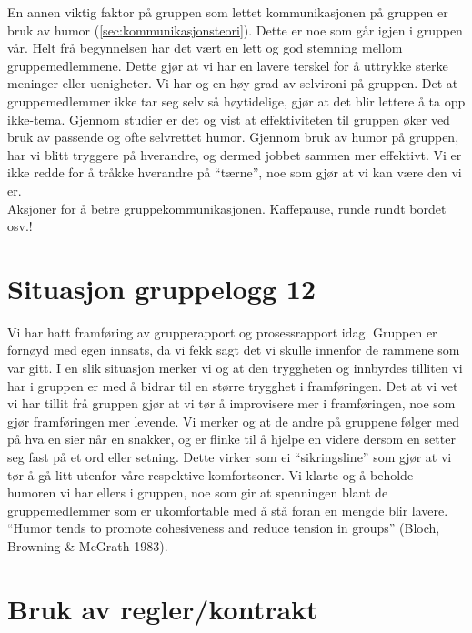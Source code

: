 En annen viktig faktor på gruppen som lettet kommunikasjonen på gruppen er bruk
av humor (\ref{sec:kommunikasjonsteori}). Dette er noe
som går igjen i gruppen vår. Helt frå begynnelsen har det vært en lett og god stemning mellom gruppemedlemmene. 
Dette gjør at vi har en lavere terskel for å uttrykke sterke meninger eller uenigheter. Vi har og en høy grad 
av selvironi på gruppen. Det at gruppemedlemmer ikke tar seg selv så høytidelige, gjør at det blir lettere å ta 
opp ikke-tema. Gjennom studier er det og vist at effektiviteten til gruppen øker ved bruk av passende og ofte 
selvrettet humor. Gjennom bruk av humor på gruppen, har vi blitt tryggere på hverandre, og dermed jobbet sammen 
mer effektivt. Vi er ikke redde for å tråkke hverandre på ``tærne'', noe som gjør at vi kan være den vi er. \\

Aksjoner for å betre gruppekommunikasjonen. Kaffepause, runde rundt bordet osv.!\\

\section{Situasjon gruppelogg 12}
Vi har hatt framføring av grupperapport og prosessrapport idag. Gruppen er fornøyd med egen innsats, da 
vi fekk sagt det vi skulle innenfor de rammene som var gitt. I en slik situasjon merker vi og at den 
tryggheten og innbyrdes tilliten vi har i gruppen er med å bidrar til en større trygghet i framføringen. 
Det at vi vet vi har tillit frå gruppen gjør at vi tør å improvisere mer i framføringen, noe som gjør 
framføringen mer levende. Vi merker og at de andre på gruppene følger med på hva en sier når en snakker, 
og er flinke til å hjelpe en videre dersom en setter seg fast på et ord eller setning. Dette virker som 
ei ``sikringsline'' som gjør at vi tør å gå litt utenfor våre respektive komfortsoner. Vi klarte og å beholde 
humoren vi har ellers i gruppen, noe som gir at spenningen blant de gruppemedlemmer som er ukomfortable 
med å stå foran en mengde blir lavere. ``Humor tends to promote cohesiveness and reduce tension in groups'' 
(Bloch, Browning \& McGrath 1983).\\


\section{Bruk av regler/kontrakt}

